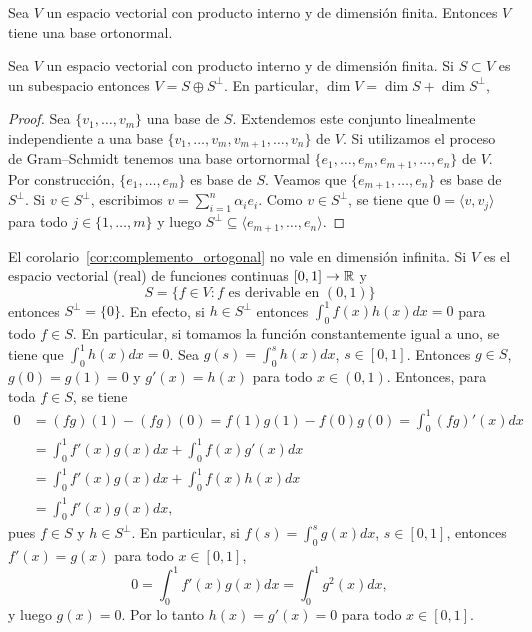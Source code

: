 
\begin{cor}
	Sea $V$ un espacio vectorial con producto interno y de dimensión finita.
	Entonces $V$ tiene una base ortonormal.
\end{cor}

\begin{cor}
	\label{cor:complemento_ortogonal}
	Sea $V$ un espacio vectorial con producto interno y de dimensión finita. Si
	$S\subset V$ es un subespacio entonces $V=S\oplus S^\perp$. En particular, 
	$\dim V=\dim S+\dim S^\perp$, 

	\begin{proof}
		Sea $\{v_1,\dots,v_m\}$ una base de $S$. Extendemos este conjunto
		linealmente independiente a una base
		$\{v_1,\dots,v_m,v_{m+1},\dots,v_n\}$ de $V$. Si utilizamos el proceso
		de Gram--Schmidt tenemos una base ortornormal
		$\{e_1,\dots,e_m,e_{m+1},\dots,e_n\}$ de $V$. Por construcción,
		$\{e_1,\dots,e_m\}$ es base de $S$. Veamos que
		$\{e_{m+1},\dots,e_{n}\}$ es base de $S^\perp$. Si $v\in S^\perp$, escribimos
		$v=\sum_{i=1}^n\alpha_ie_i$. Como $v\in S^\perp$, se tiene que 
		$0=\langle v,v_j\rangle$ para todo $j\in\{1,\dots,m\}$ y luego
		$S^\perp\subseteq\langle e_{m+1},\dots,e_n\rangle$. 
	\end{proof}
\end{cor}

\begin{example}
	El corolario~\ref{cor:complemento_ortogonal} no vale en dimensión infinita.
	Si $V$ es el espacio vectorial (real) de funciones continuas $[0,1]\to\mathbb{R}$ y
	\[
	S=\{f\in V:f\text{ es derivable en $(0,1)$}\}
	\]
	entonces $S^\perp=\{0\}$. En efecto, si $h\in S^\perp$ entonces
	$\int_{0}^{1}f(x)h(x)dx=0$ para todo $f\in S$. En particular, si tomamos
	la función constantemente igual a uno, se tiene que $\int_0^1h(x)dx=0$.
	Sea $g(s)=\int_0^sh(x)dx$, $s\in[0,1]$. Entonces $g\in S$, $g(0)=g(1)=0$ y
	$g'(x)=h(x)$ para todo $x\in(0,1)$. Entonces, para toda $f\in S$, se tiene 
	\begin{align*}
		0&=(fg)(1)-(fg)(0)=f(1)g(1)-f(0)g(0)=\int_0^1 (fg)'(x)dx\\
		&=\int_0^1f'(x)g(x)dx+\int_0^1f(x)g'(x)dx\\
		&=\int_0^1f'(x)g(x)dx+\int_0^1f(x)h(x)dx\\
		&=\int_0^1f'(x)g(x)dx,
	\end{align*}
	pues $f\in S$ y $h\in S^\perp$. En particular, si $f(s)=\int_0^sg(x)dx$,
	$s\in[0,1]$, entonces $f'(x)=g(x)$ para todo $x\in[0,1]$, 
	\[
		0=\int_0^1f'(x)g(x)dx=\int_0^1g^2(x)dx,
	\]
	y luego $g(x)=0$. Por lo tanto $h(x)=g'(x)=0$ para todo $x\in[0,1]$. 
\end{example}

